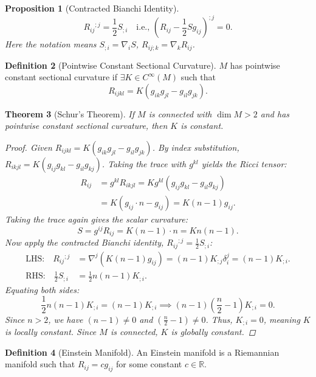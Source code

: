 \documentclass[11pt, a4paper]{article}
\theoremstyle{plain}
\newtheorem{theorem}{Theorem}[section]
\newtheorem{proposition}[theorem]{Proposition}
\theoremstyle{definition}
\newtheorem{definition}[theorem]{Definition}
\theoremstyle{remark}
\begin{document}
{\begin{proposition}[Contracted Bianchi Identity]
\[ R_{ij}{}^{;j} = \frac{1}{2} S_{;i} \quad \text{i.e., } \left( R_{ij} - \frac{1}{2} S g_{ij} \right)^{;j} = 0. \]
Here the notation means $S_{;i} = \nabla_i S$, $R_{ij;k} = \nabla_k R_{ij}$.
\end{proposition}

\begin{definition}[Pointwise Constant Sectional Curvature]
$M$ has pointwise constant sectional curvature if $\exists K \in C^\infty(M)$ such that
\[ R_{ijkl} = K (g_{ik}g_{jl} - g_{il}g_{jk}). \]
\end{definition}

\begin{theorem}[Schur's Theorem]
If $M$ is connected with $\dim M > 2$ and has pointwise constant sectional curvature, then $K$ is constant.
\begin{proof}
Given $R_{ijkl} = K (g_{ik}g_{jl} - g_{il}g_{jk})$. By index substitution, $R_{ikjl} = K (g_{ij}g_{kl} - g_{il}g_{kj})$.
Taking the trace with $g^{kl}$ yields the Ricci tensor:
\begin{align*}
R_{ij} &= g^{kl} R_{ikjl} = K g^{kl} (g_{ij}g_{kl} - g_{il}g_{kj}) \\
&= K (g_{ij} \cdot n - g_{ij}) = K(n-1)g_{ij}.
\end{align*}
Taking the trace again gives the scalar curvature:
\[ S = g^{ij} R_{ij} = K(n-1) \cdot n = K n(n-1). \]
Now apply the contracted Bianchi identity, $R_{ij}{}^{;j} = \frac{1}{2} S_{;i}$:
\begin{align*}
\text{LHS:} \quad R_{ij}{}^{;j} &= \nabla^j (K(n-1)g_{ij}) = (n-1) K_{;j} \delta_i^j = (n-1) K_{;i}. \\
\text{RHS:} \quad \frac{1}{2} S_{;i} &= \frac{1}{2} n(n-1) K_{;i}.
\end{align*}
Equating both sides:
\[ \frac{1}{2} n(n-1) K_{;i} = (n-1) K_{;i} \implies (n-1)\left(\frac{n}{2} - 1\right) K_{;i} = 0. \]
Since $n > 2$, we have $(n-1) \neq 0$ and $\left(\frac{n}{2} - 1\right) \neq 0$. Thus, $K_{;i} = 0$, meaning $K$ is locally constant. Since $M$ is connected, $K$ is globally constant.
\end{proof}
\end{theorem}

\begin{definition}[Einstein Manifold]
An Einstein manifold is a Riemannian manifold such that $R_{ij} = c g_{ij}$ for some constant $c \in \mathbb{R}$.
\end{definition}

}
\end{document}

